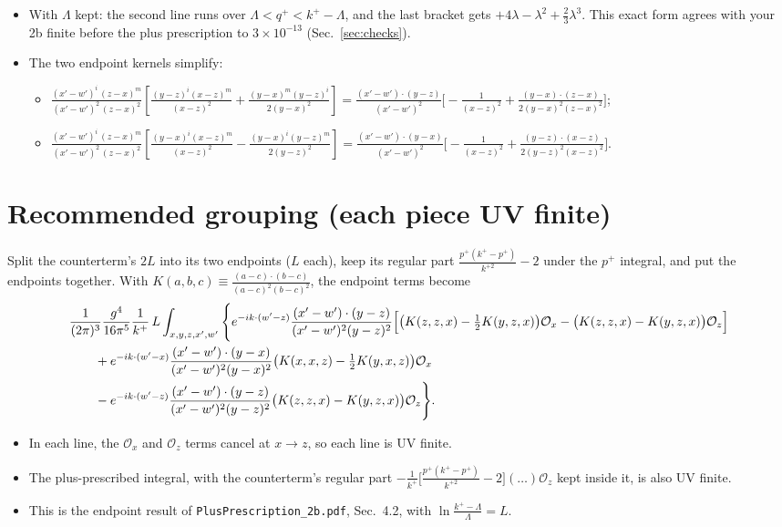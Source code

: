 \documentclass[10pt]{article}
\numberwithin{equation}{section}
\newcommand{\preE}{\frac{1}{(2\pi)^{3}}\frac{g^{4}}{16\pi^{5}}\frac{1}{k^{+}}}
\newcommand{\Kxw}{\frac{(x'-w')^{i}\,(z-x)^{m}}{(x'-w')^{2}\,(z-x)^{2}}}
\newcommand{\BB}{\left[\frac{(y-x)^{i}(x-z)^{m}}{(x-z)^{2}}-\frac{(y-x)^{i}(y-z)^{m}}{2(y-z)^{2}}\right]}
\newcommand{\BF}{\left[\frac{(y-z)^{i}(x-z)^{m}}{(x-z)^{2}}+\frac{(y-x)^{m}(y-z)^{i}}{2(y-x)^{2}}\right]}
\newcommand{\Ox}{\mathcal O_x}
\newcommand{\Oz}{\mathcal O_z}
\begin{document}
\begin{itemize}
\item With $\Lambda$ kept: the second line runs over $\Lambda<q^+<k^+-\Lambda$, and the last bracket gets $+4\lambda-\lambda^2+\frac23\lambda^3$. This exact form agrees with your 2b finite before the plus prescription to $3\times10^{-13}$ (Sec.~\ref{sec:checks}).
\item The two endpoint kernels simplify:
\begin{itemize}
\item $\Kxw\BF=\frac{(x'-w')\cdot(y-z)}{(x'-w')^2}\Big[-\frac{1}{(x-z)^2}+\frac{(y-x)\cdot(z-x)}{2(y-x)^2(z-x)^2}\Big]$;
\item $\Kxw\BB=\frac{(x'-w')\cdot(y-x)}{(x'-w')^2}\Big[-\frac{1}{(x-z)^2}+\frac{(y-z)\cdot(x-z)}{2(y-z)^2(x-z)^2}\Big]$.
\end{itemize}
\end{itemize}

\section{Recommended grouping (each piece UV finite)}\label{sec:group}
Split the counterterm's $2L$ into its two endpoints ($L$ each), keep its regular part $\frac{p^+(k^+-p^+)}{k^{+2}}-2$ under the $p^+$ integral, and put the endpoints together. With $K(a,b,c)\equiv\frac{(a-c)\cdot(b-c)}{(a-c)^2(b-c)^2}$, the endpoint terms become
\begin{align}
&\preE\,L\int_{x,y,z,x',w'}\Bigg\{e^{-ik\cdot(w'-z)}\frac{(x'-w')\cdot(y-z)}{(x'-w')^{2}(y-z)^{2}}\Big[\big(K(z,z,x)-\tfrac12K(y,z,x)\big)\Ox-\big(K(z,z,x)-K(y,z,x)\big)\Oz\Big]\notag\\
&\qquad+e^{-ik\cdot(w'-x)}\frac{(x'-w')\cdot(y-x)}{(x'-w')^{2}(y-x)^{2}}\big(K(x,x,z)-\tfrac12K(y,x,z)\big)\Ox\notag\\
&\qquad-e^{-ik\cdot(w'-z)}\frac{(x'-w')\cdot(y-z)}{(x'-w')^{2}(y-z)^{2}}\big(K(z,z,x)-K(y,z,x)\big)\Oz\Bigg\}.
\label{eq:endgroup}
\end{align}
\begin{itemize}
\item In each line, the $\Ox$ and $\Oz$ terms cancel at $x\to z$, so each line is UV finite.
\item The plus-prescribed integral, with the counterterm's regular part $-\frac{1}{k^+}\big[\frac{p^+(k^+-p^+)}{k^{+2}}-2\big](\dots)\Oz$ kept inside it, is also UV finite.
\item This is the endpoint result of \texttt{PlusPrescription\_2b.pdf}, Sec.~4.2, with $\ln\frac{k^+-\Lambda}{\Lambda}=L$.
\end{itemize}
\end{document}

